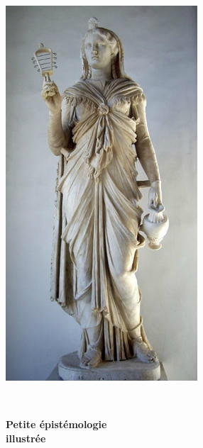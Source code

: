 \begin{titlepage}
%

\begin{center}
\includegraphics[scale=0.40]{./presentation/anubis}
\end{center}

\textsc{\Large }\\[0.5cm]

\HRule

\begin{center}
{\huge \bfseries  Petite épistémologie\\
illustrée\\[0.4cm] }
\end{center}

\HRule \\[1.5cm]



\end{titlepage}
